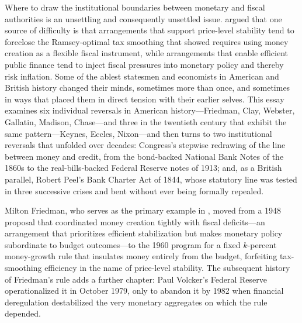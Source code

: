 \documentclass[12pt]{article}
\begin{document}
Where to draw the institutional boundaries between monetary and fiscal
authorities  is an unsettling and consequently unsettled issue.
\citet{Sargent2011} argued that one source of difficulty is that 
arrangements that support price-level stability tend to foreclose the
Ramsey-optimal tax smoothing that \citet{LucasStokey1983} showed
requires using money creation as a flexible fiscal instrument, while
arrangements that enable efficient public finance tend to inject fiscal
pressures into monetary policy and thereby risk inflation.  
%
 Some of the ablest statesmen
and economists in American and British history changed their minds,
sometimes more than once, and sometimes in ways that placed them in
direct tension with their earlier selves.  This essay examines six
individual reversals in American history---Friedman, Clay, Webster,
Gallatin, Madison, Chase---and three in the twentieth century that
exhibit the same pattern---Keynes, Eccles, Nixon---and then turns to two
institutional reversals that unfolded over decades: Congress's stepwise
redrawing of the line between money and credit, from the bond-backed
National Bank Notes of the 1860s to the real-bills-backed Federal
Reserve notes of 1913; and, as a British parallel, Robert Peel's Bank
Charter Act of 1844, whose statutory line was tested in three successive
crises and bent without ever being formally repealed.

Milton Friedman, who serves as the primary example in \citet{Sargent2011},
moved from a 1948 proposal that coordinated money creation tightly with
fiscal deficits---an arrangement that prioritizes efficient stabilization
but makes monetary policy subordinate to budget outcomes---to the 1960
program for a fixed $k$-percent money-growth rule that insulates money
entirely from the budget, forfeiting tax-smoothing efficiency in the
name of price-level stability.  The subsequent history of Friedman's
rule adds a further chapter: Paul Volcker's Federal Reserve
operationalized it in October 1979, only to abandon it by 1982 when
financial deregulation destabilized the very monetary aggregates on
which the rule depended.
\end{document}
